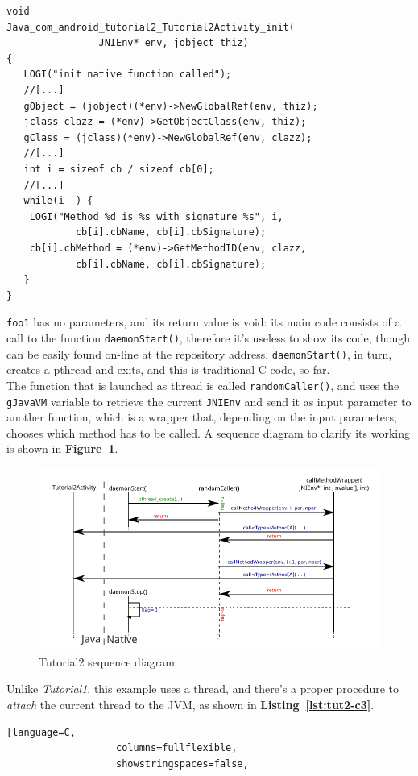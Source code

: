\documentclass[a4paper,10pt]{article}
\newcommand{\keyword}[1]{\texttt{#1}}
\newcommand{\reff}[1]{\textbf{Figure~\ref{#1}}}
\newcommand{\refl}[1]{\textbf{Listing~\ref{#1}}}
\begin{document}
\begin{multicols}{2}
\begin{lstlisting}
void
Java_com_android_tutorial2_Tutorial2Activity_init(
				JNIEnv* env, jobject thiz)
{
   LOGI("init native function called");   
   //[...]   
   gObject = (jobject)(*env)->NewGlobalRef(env, thiz);
   jclass clazz = (*env)->GetObjectClass(env, thiz);
   gClass = (jclass)(*env)->NewGlobalRef(env, clazz);   
   //[...]   
   int i = sizeof cb / sizeof cb[0];
   //[...]   
   while(i--) {
   	LOGI("Method %d is %s with signature %s", i,
   			cb[i].cbName, cb[i].cbSignature);
   	cb[i].cbMethod = (*env)->GetMethodID(env, clazz,
   			cb[i].cbName, cb[i].cbSignature);
   }
}
\end{lstlisting}
\keyword{foo1} has no parameters, and its return value is void: its main code consists of a call to the function \keyword{daemonStart()}, therefore it's useless to show its code, though can be easily found on-line at the repository address. \keyword{daemonStart()}, in turn, creates a pthread and exits, and this is traditional C code, so far.\\
The function that is launched as thread is called \keyword{randomCaller()}, and uses the \keyword{gJavaVM} variable to retrieve the current \keyword{JNIEnv} and send it as input parameter to another function, which is a wrapper that, depending on the input parameters, chooses which method has to be called. A sequence diagram to clarify its working is shown in \reff{fig:tut12-seq}.
\begin{figure}[t]
 \includegraphics[width=17cm]{./figures/sequence.pdf}
 \caption{Tutorial2 sequence diagram}
 \label{fig:tut12-seq}
\end{figure}
Unlike \textit{Tutorial1}, this example uses a thread, and there's a proper procedure to \textit{attach} the current thread to the JVM, as shown in \refl{lst:tut2-c3}.
\begin{lstlisting}[language=C,
				   columns=fullflexible,
				   showstringspaces=false,

\end{lstlisting}
\end{multicols}
\end{document}
